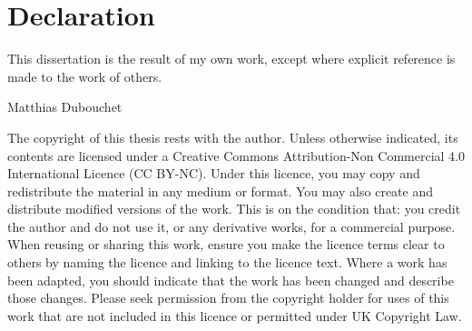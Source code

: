 
\chapter*{Declaration}
This dissertation is the result of my own work, except where explicit reference
is made to the work of others.

\hfill Matthias Dubouchet

\vspace{2cm}
The copyright of this thesis rests with the author. Unless otherwise indicated, 
its contents are licensed under a Creative Commons Attribution-Non 
Commercial 4.0 International Licence (CC BY-NC). 
Under this licence, you may copy and redistribute the material in any medium 
or format. You may also create and distribute modified versions of the work. 
This is on the condition that: you credit the author and do not use it, or any 
derivative works, for a commercial purpose. 
When reusing or sharing this work, ensure you make the licence terms clear to 
others by naming the licence and linking to the licence text. Where a work has 
been adapted, you should indicate that the work has been changed and 
describe those changes. 
Please seek permission from the copyright holder for uses of this work that are 
not included in this licence or permitted under UK Copyright Law.